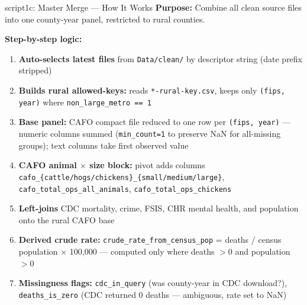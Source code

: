 \documentclass[aspectratio=169]{beamer}
\begin{document}
\begin{frame}{script1c: Master Merge — How It Works}
\textbf{Purpose:} Combine all clean source files into one county-year panel, restricted to rural counties.

\vspace{0.3em}
\textbf{Step-by-step logic:}
\begin{enumerate}\small
    \item \textbf{Auto-selects latest files} from \texttt{Data/clean/} by descriptor string (date prefix stripped)
    \item \textbf{Builds rural allowed-keys:} reads \texttt{*-rural-key.csv}, keeps only \texttt{(fips, year)} where \texttt{non\_large\_metro == 1}
    \item \textbf{Base panel:} CAFO compact file reduced to one row per \texttt{(fips, year)} — numeric columns summed (\texttt{min\_count=1} to preserve NaN for all-missing groups); text columns take first observed value
    \item \textbf{CAFO animal $\times$ size block:} pivot adds columns \texttt{cafo\_\{cattle/hogs/chickens\}\_\{small/medium/large\}}, \texttt{cafo\_total\_ops\_all\_animals}, \texttt{cafo\_total\_ops\_chickens}
    \item \textbf{Left-joins} CDC mortality, crime, FSIS, CHR mental health, and population onto the rural CAFO base
    \item \textbf{Derived crude rate:} \texttt{crude\_rate\_from\_census\_pop} = deaths / census population $\times$ 100{,}000 — computed only where deaths $> 0$ and population $> 0$
    \item \textbf{Missingness flags:} \texttt{cdc\_in\_query} (was county-year in CDC download?), \texttt{deaths\_is\_zero} (CDC returned 0 deaths — ambiguous, rate set to NaN)
\end{enumerate}
\end{frame}
\end{document}
